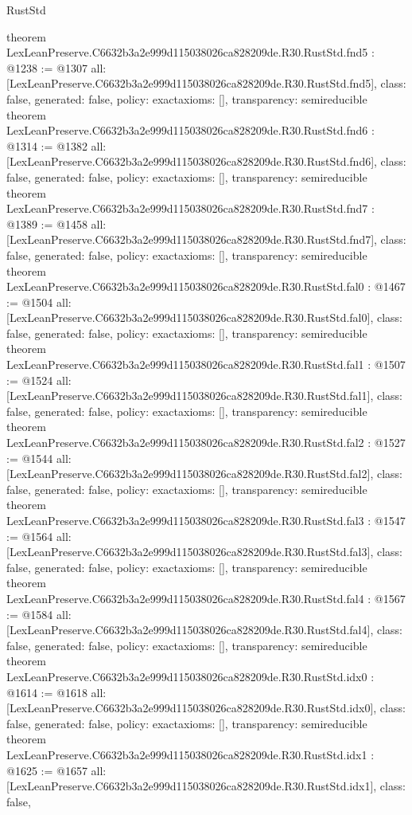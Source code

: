 \begin{lexlean}{RustStd}
\begin{coremodule}
{}
theorem LexLeanPreserve.C6632b3a2e999d115038026ca828209de.R30.RustStd.fnd5 : @1238 := @1307 {
  all: [LexLeanPreserve.C6632b3a2e999d115038026ca828209de.R30.RustStd.fnd5],
  class: false,
  generated: false,
  policy: exact{axioms: []},
  transparency: semireducible
}
theorem LexLeanPreserve.C6632b3a2e999d115038026ca828209de.R30.RustStd.fnd6 : @1314 := @1382 {
  all: [LexLeanPreserve.C6632b3a2e999d115038026ca828209de.R30.RustStd.fnd6],
  class: false,
  generated: false,
  policy: exact{axioms: []},
  transparency: semireducible
}
theorem LexLeanPreserve.C6632b3a2e999d115038026ca828209de.R30.RustStd.fnd7 : @1389 := @1458 {
  all: [LexLeanPreserve.C6632b3a2e999d115038026ca828209de.R30.RustStd.fnd7],
  class: false,
  generated: false,
  policy: exact{axioms: []},
  transparency: semireducible
}
theorem LexLeanPreserve.C6632b3a2e999d115038026ca828209de.R30.RustStd.fal0 : @1467 := @1504 {
  all: [LexLeanPreserve.C6632b3a2e999d115038026ca828209de.R30.RustStd.fal0],
  class: false,
  generated: false,
  policy: exact{axioms: []},
  transparency: semireducible
}
theorem LexLeanPreserve.C6632b3a2e999d115038026ca828209de.R30.RustStd.fal1 : @1507 := @1524 {
  all: [LexLeanPreserve.C6632b3a2e999d115038026ca828209de.R30.RustStd.fal1],
  class: false,
  generated: false,
  policy: exact{axioms: []},
  transparency: semireducible
}
theorem LexLeanPreserve.C6632b3a2e999d115038026ca828209de.R30.RustStd.fal2 : @1527 := @1544 {
  all: [LexLeanPreserve.C6632b3a2e999d115038026ca828209de.R30.RustStd.fal2],
  class: false,
  generated: false,
  policy: exact{axioms: []},
  transparency: semireducible
}
theorem LexLeanPreserve.C6632b3a2e999d115038026ca828209de.R30.RustStd.fal3 : @1547 := @1564 {
  all: [LexLeanPreserve.C6632b3a2e999d115038026ca828209de.R30.RustStd.fal3],
  class: false,
  generated: false,
  policy: exact{axioms: []},
  transparency: semireducible
}
theorem LexLeanPreserve.C6632b3a2e999d115038026ca828209de.R30.RustStd.fal4 : @1567 := @1584 {
  all: [LexLeanPreserve.C6632b3a2e999d115038026ca828209de.R30.RustStd.fal4],
  class: false,
  generated: false,
  policy: exact{axioms: []},
  transparency: semireducible
}
theorem LexLeanPreserve.C6632b3a2e999d115038026ca828209de.R30.RustStd.idx0 : @1614 := @1618 {
  all: [LexLeanPreserve.C6632b3a2e999d115038026ca828209de.R30.RustStd.idx0],
  class: false,
  generated: false,
  policy: exact{axioms: []},
  transparency: semireducible
}
theorem LexLeanPreserve.C6632b3a2e999d115038026ca828209de.R30.RustStd.idx1 : @1625 := @1657 {
  all: [LexLeanPreserve.C6632b3a2e999d115038026ca828209de.R30.RustStd.idx1],
  class: false,
}
\end{coremodule}
\end{lexlean}
